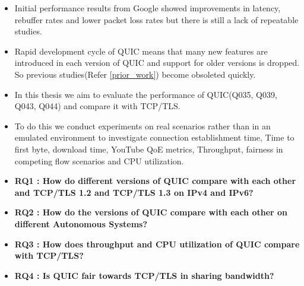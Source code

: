 \begin{frame}
\begin{itemize}
    \itemsep2em
    \item Initial performance results from Google showed improvements in latency, rebuffer rates and lower packet loss rates but there is still a lack
    of repeatable studies.
    
    \item Rapid development cycle of QUIC means
    that many new features are introduced in each version of QUIC and support for older
    versions is dropped. So previous studies(Refer \ref{prior_work}) become obsoleted quickly.
    
    \item In this thesis we aim to evaluate the performance of QUIC(Q035, Q039, Q043, Q044) and compare it with
    TCP/TLS. 
    
    \item To do this we conduct experiments on real scenarios rather than in an emulated environment to investigate connection establishment time, Time to first byte, download time, YouTube QoE metrics, Throughput,
    fairness in competing flow scenarios and CPU utilization.
    
\end{itemize}
\end{frame}
\clearpage

\begin{frame}
    \begin{itemize}
        \itemsep3em 
        \item\textbf{RQ1 : How do different versions of QUIC compare with each other and TCP/TLS 1.2 and TCP/TLS 1.3 on IPv4 and IPv6?}
        
        \item\textbf{RQ2 : How do the versions of QUIC compare with each other on different Autonomous Systems?}

        \item\textbf{RQ3 : How does throughput and CPU utilization of QUIC compare with TCP/TLS?}
        
        
        \item\textbf{RQ4 : Is QUIC fair towards TCP/TLS in sharing bandwidth?}
        
    \end{itemize}
\end{frame}
\clearpage



